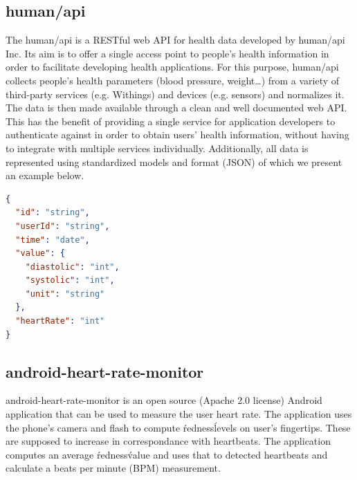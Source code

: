 
\subsection{human/api}
\label{section:humanapi}

The human/api is a RESTful web API for health data developed by human/api Inc.
Its aim is to offer a single access point to people's health information in order to facilitate developing health applications.
For this purpose, human/api collects people's health parameters (blood pressure, weight\ldots) from a variety of third-party services (e.g. Withings) and devices (e.g. sensors) and normalizes it.
The data is then made available through a clean and well documented web API.
This has the benefit of providing a single service for application developers to authenticate against in order to obtain users' health information, without having to integrate with multiple services individually.
Additionally, all data is represented using standardized models and format (JSON) of which we present an example below. \cite{HumanAPI}



\begin{lstlisting}[language=JSON]
{
  "id": "string",
  "userId": "string",
  "time": "date",
  "value": {
    "diastolic": "int",
    "systolic": "int",
    "unit": "string"
  },
  "heartRate": "int"
}
\end{lstlisting}

\subsection{android-heart-rate-monitor}
\label{subsec:hr}

android-heart-rate-monitor is an open source (Apache 2.0 license) Android application that can be used to measure the user heart rate. 
The application uses the phone's camera and flash to compute \'redness\' levels on user's fingertips. 
These are supposed to increase in correspondance with heartbeats.
The application computes an average \'redness\' value and uses that to detected heartbeats and calculate a beats per minute (BPM) measurement. \cite{AndroidHeartRateMonitor}

